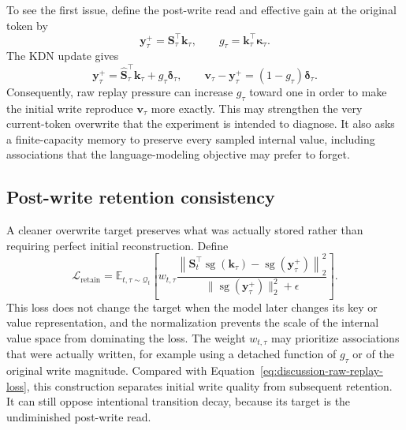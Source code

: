 \documentclass[11pt]{article}
\newcommand{\vct}[1]{\boldsymbol{#1}}
\begin{document}
To see the first issue, define the post-write read and effective gain at the original token by
\begin{equation}
  \vct{y}_\tau^+
  =\vct{S}_\tau^\top\vct{k}_\tau,
  \qquad
  g_\tau=\vct{k}_\tau^\top\vct{\kappa}_\tau.
  \label{eq:discussion-replay-post-write-target}
\end{equation}
The KDN update gives
\begin{equation}
  \vct{y}_\tau^+
  =\widehat{\vct{S}}_\tau^\top\vct{k}_\tau
   +g_\tau\vct{\delta}_\tau,
  \qquad
  \vct{v}_\tau-\vct{y}_\tau^+
  =(1-g_\tau)\vct{\delta}_\tau.
  \label{eq:discussion-replay-immediate-residual}
\end{equation}
Consequently, raw replay pressure can increase $g_\tau$ toward one in order to make the initial
write reproduce $\vct{v}_\tau$ more exactly. This may strengthen the very current-token overwrite
that the experiment is intended to diagnose. It also asks a finite-capacity memory to preserve
every sampled internal value, including associations that the language-modeling objective may
prefer to forget.

\subsection{Post-write retention consistency}

A cleaner overwrite target preserves what was actually stored rather than requiring perfect
initial reconstruction. Define
\begin{equation}
  \mathcal{L}_{\mathrm{retain}}
  =\mathbb{E}_{t,\tau\sim\mathcal{Q}_t}\!\left[
    w_{t,\tau}
    \frac{
      \left\|
        \vct{S}_t^\top\operatorname{sg}(\vct{k}_\tau)
        -\operatorname{sg}(\vct{y}_\tau^+)
      \right\|_2^2
    }{
      \|\operatorname{sg}(\vct{y}_\tau^+)\|_2^2+\epsilon
    }
  \right].
  \label{eq:discussion-retention-consistency-loss}
\end{equation}
This loss does not change the target when the model later changes its key or value representation,
and the normalization prevents the scale of the internal value space from dominating the loss.
The weight $w_{t,\tau}$ may prioritize associations that were actually written, for example using
a detached function of $g_\tau$ or of the original write magnitude. Compared with
Equation~\eqref{eq:discussion-raw-replay-loss}, this construction separates initial write quality
from subsequent retention. It can still oppose intentional transition decay, because its target is
the undiminished post-write read.
\end{document}

